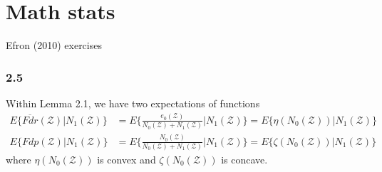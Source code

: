 \documentclass{article}
\begin{document}
\section*{Math stats}
Efron (2010) exercises

\subsubsection*{2.5}
Within Lemma 2.1, we have two expectations of functions
\begin{displaymath}
\begin{split}
E\{\overline{Fdr}(\mathcal{Z}) | N_1(\mathcal{Z})\} 
& = E\{ \frac{e_0(\mathcal{Z})}{N_0(\mathcal{Z}) + N_1(\mathcal{Z})} |N_1(\mathcal{Z})\}
= E\{ \eta(N_0(\mathcal{Z})) | N_1(\mathcal{Z}) \} \\
E\{Fdp(\mathcal{Z}) | N_1(\mathcal{Z})\} 
& = E\{ \frac{N_0(\mathcal{Z})}{N_0(\mathcal{Z}) + N_1(\mathcal{Z})} |N_1(\mathcal{Z})\}
= E\{ \zeta(N_0(\mathcal{Z})) | N_1(\mathcal{Z}) \}
\end{split}
\end{displaymath}
where $\eta(N_0(\mathcal{Z}))$ is convex and $\zeta(N_0(\mathcal{Z}))$
is concave.
\end{document}
